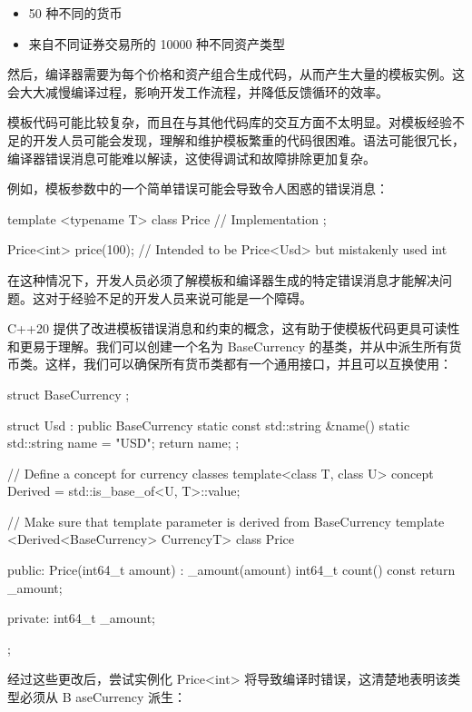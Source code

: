 \begin{itemize}
\item
50 种不同的货币

\item
来自不同证券交易所的 10000 种不同资产类型
\end{itemize}

然后，编译器需要为每个价格和资产组合生成代码，从而产生大量的模板实例。这会大大减慢编译过程，影响开发工作流程，并降低反馈循环的效率。


模板代码可能比较复杂，而且在与其他代码库的交互方面不太明显。对模板经验不足的开发人员可能会发现，理解和维护模板繁重的代码很困难。语法可能很冗长，编译器错误消息可能难以解读，这使得调试和故障排除更加复杂。

例如，模板参数中的一个简单错误可能会导致令人困惑的错误消息：

\begin{cpp}
template <typename T>
class Price {
    // Implementation
};

Price<int> price(100); // Intended to be Price<Usd> but mistakenly used int
\end{cpp}

在这种情况下，开发人员必须了解模板和编译器生成的特定错误消息才能解决问题。这对于经验不足的开发人员来说可能是一个障碍。

C++20 提供了改进模板错误消息和约束的概念，这有助于使模板代码更具可读性和更易于理解。我们可以创建一个名为 BaseCurrency 的基类，并从中派生所有货币类。这样，我们可以确保所有货币类都有一个通用接口，并且可以互换使用：

\begin{cpp}
struct BaseCurrency {
};

struct Usd : public BaseCurrency {
    static const std::string &name() {
        static std::string name = "USD";
        return name;
    }
};

// Define a concept for currency classes
template<class T, class U>
concept Derived = std::is_base_of<U, T>::value;

// Make sure that template parameter is derived from BaseCurrency
template <Derived<BaseCurrency> CurrencyT>
class Price {
public:
    Price(int64_t amount) : _amount(amount) {}
    int64_t count() const { return _amount; }

private:
    int64_t _amount;
};
\end{cpp}

经过这些更改后，尝试实例化 Price<int> 将导致编译时错误，这清楚地表明该类型必须从 B aseCurrency 派生：

